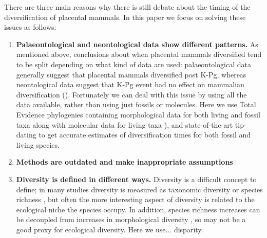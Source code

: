 \documentclass[12pt,letterpaper]{article}
\begin{document}
There are three main reasons why there is still debate about the timing of the diversification of placental mammals. In this paper we focus on solving these issues as follows: %
  \begin{enumerate}
    \item \textbf{Palaeontological and neontological data show different patterns.}
    As mentioned above, conclusions about when placental mammals diversified tend to be split depending on what kind of data are used: palaeontological data generally suggest that placental mammals diversified post K-Pg, whereas neontological data suggest that K-Pg event had no effect on mammalian diversification (). 
    Fortunately we can deal with this issue by using all the data available, rather than using just fossils or molecules. 
    Here we use Total Evidence phylogenies containing morphological data for both living and fossil taxa along with molecular data for living taxa \cite{eernissetaxonomic1993,ronquista2012}), and state-of-the-art tip-dating \cite{ronquista2012,Wood01032013} to get accurate estimates of diversification times for both fossil and living species.
    \item \textbf{Methods are outdated and make inappropriate assumptions} %
    \item \textbf{Diversity is defined in different ways.}
    Diversity is a difficult concept to define; in many studies diversity is measured as taxonomic diversity or species richness \cite{Stadler12042011,meredithimpacts2011,O'Leary08022013}, but often the more interesting aspect of diversity is related to the ecological niche the species occupy. 
    In addition, species richness increases can be decoupled from increases in morphological diversity \cite{slaterCetacean,ruta2013,hopkinsdecoupling2013}, so may not be a good proxy for ecological diversity. 
    Here we use... disparity. 
  \end{enumerate}
\end{document}

